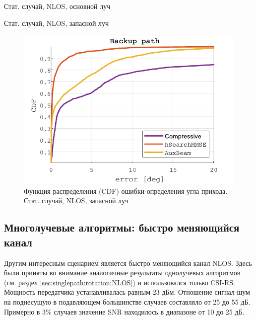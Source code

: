 \begin{table}[H]
  \begin{center}
    \caption{Стат. случай, NLOS, основной луч}
    \label{tab:multipath:static:NLOS:1}
  \end{center}
\end{table}

\begin{table}[H]
  \begin{center}
    \caption{Стат. случай, NLOS, запасной луч}
    \label{tab:multipath:static:NLOS:2}
  \end{center}
\end{table}
\begin{figure}[H]
  \centering
  \includegraphics{results/rus/multipath-static-NLOS-2}
  \caption{Функция распределения (CDF) ошибки определения угла прихода. Стат. случай, NLOS, запасной луч}
  \label{fig:multipath:static:NLOS:2}
\end{figure}

\subsection{Многолучевые алгоритмы: быстро меняющийся канал}
Другим интересным сценарием является быстро меняющийся канал NLOS. Здесь были
приняты во внимание аналогичные результаты однолучевых алгоритмов (см. раздел
\ref{sec:singlepath:rotation:NLOS}) и использовался только CSI-RS.  Мощность
передатчика устанавливалась равным 23 дБм.  Отношение сигнал-шум на поднесущую в
подавляющем большинстве случаев составляло от 25 до 55 дБ.  Примерно в 3\%
случаев значение SNR находилось в диапазоне от 10 до 25 дБ.

